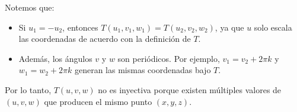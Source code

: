 Notemos que:
\begin{itemize}
	\item Si \( u_1 = -u_2 \), entonces \( T(u_1, v_1, w_1) = T(u_2, v_2, w_2) \), ya que \( u \) solo escala las coordenadas de acuerdo con la definición de \( T \).
	\item Además, los ángulos \( v \) y \( w \) son periódicos. Por ejemplo, \( v_1 = v_2 + 2\pi k \) y \( w_1 = w_2 + 2\pi k \) generan las mismas coordenadas bajo \( T \).
\end{itemize}

Por lo tanto, \( T(u, v, w) \) no es inyectiva porque existen múltiples valores de \( (u, v, w) \) que producen el mismo punto \( (x, y, z) \).